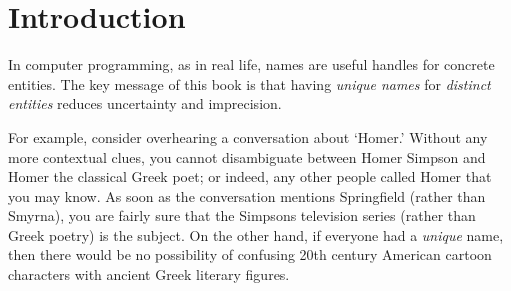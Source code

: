 \chapter{Introduction }
\label{chapter:vanilla}

\graphicspath{{img/}{vanilla/img/}{part1/vanilla/img/}{tikz/}{vanilla/tikz/}{part1/vanilla/tikz/}}



In computer programming, as in real life, 
names are useful handles for concrete entities.
The key message of this book is that
having \textit{unique names} for
\textit{distinct entities}
reduces uncertainty and imprecision.

For example, consider overhearing a conversation
about `Homer.' Without any more contextual clues, you
cannot disambiguate between Homer Simpson and Homer the
classical Greek poet; or indeed, any other people
called Homer that you may know.
As soon as the conversation mentions Springfield
(rather than Smyrna), you are fairly sure that the
Simpsons television series (rather than Greek poetry)
is the subject.
On the other hand, if everyone had a \textit{unique} name,
then there would be no possibility of confusing 20th century
American cartoon characters with ancient Greek literary figures.



